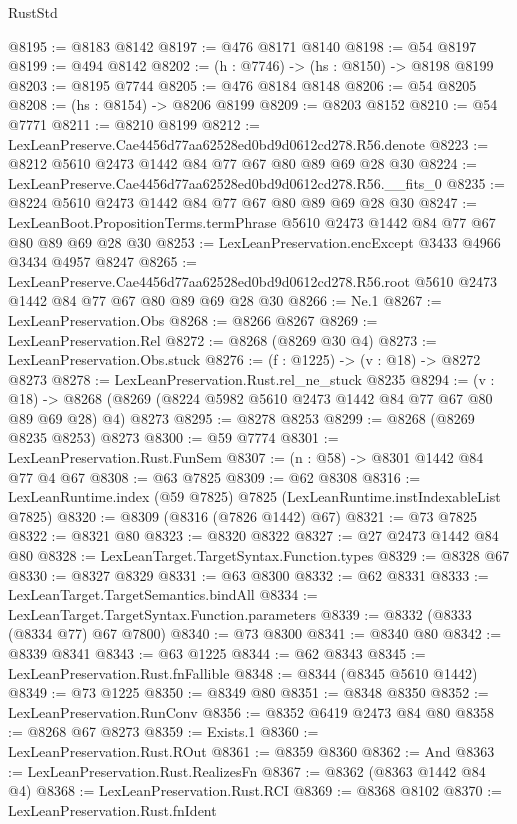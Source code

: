 \begin{lexlean}{RustStd}
\begin{coremodule}
@8195 := @8183 @8142
@8197 := @476 @8171 @8140
@8198 := @54 @8197
@8199 := @494 @8142
@8202 := (h : @7746) -> (hs : @8150) -> @8198 @8199
@8203 := @8195 @7744
@8205 := @476 @8184 @8148
@8206 := @54 @8205
@8208 := (hs : @8154) -> @8206 @8199
@8209 := @8203 @8152
@8210 := @54 @7771
@8211 := @8210 @8199
@8212 := LexLeanPreserve.Cae4456d77aa62528ed0bd9d0612cd278.R56.denote
@8223 := @8212 @5610 @2473 @1442 @84 @77 @67 @80 @89 @69 @28 @30
@8224 := LexLeanPreserve.Cae4456d77aa62528ed0bd9d0612cd278.R56.__fits_0
@8235 := @8224 @5610 @2473 @1442 @84 @77 @67 @80 @89 @69 @28 @30
@8247 := LexLeanBoot.PropositionTerms.termPhrase @5610 @2473 @1442 @84 @77 @67 @80 @89 @69 @28 @30
@8253 := LexLeanPreservation.encExcept @3433 @4966 @3434 @4957 @8247
@8265 := LexLeanPreserve.Cae4456d77aa62528ed0bd9d0612cd278.R56.root
    @5610
    @2473
    @1442
    @84
    @77
    @67
    @80
    @89
    @69
    @28
    @30
@8266 := Ne.{1}
@8267 := LexLeanPreservation.Obs
@8268 := @8266 @8267
@8269 := LexLeanPreservation.Rel
@8272 := @8268 (@8269 @30 @4)
@8273 := LexLeanPreservation.Obs.stuck
@8276 := (f : @1225) -> (v : @18) -> @8272 @8273
@8278 := LexLeanPreservation.Rust.rel_ne_stuck @8235
@8294 := (v : @18) ->
  @8268 (@8269 (@8224 @5982 @5610 @2473 @1442 @84 @77 @67 @80 @89 @69 @28) @4) @8273
@8295 := @8278 @8253
@8299 := @8268 (@8269 @8235 @8253) @8273
@8300 := @59 @7774
@8301 := LexLeanPreservation.Rust.FunSem
@8307 := (n : @58) -> @8301 @1442 @84 @77 @4 @67
@8308 := @63 @7825
@8309 := @62 @8308
@8316 := LexLeanRuntime.index (@59 @7825) @7825 (LexLeanRuntime.instIndexableList @7825)
@8320 := @8309 (@8316 (@7826 @1442) @67)
@8321 := @73 @7825
@8322 := @8321 @80
@8323 := @8320 @8322
@8327 := @27 @2473 @1442 @84 @80
@8328 := LexLeanTarget.TargetSyntax.Function.types
@8329 := @8328 @67
@8330 := @8327 @8329
@8331 := @63 @8300
@8332 := @62 @8331
@8333 := LexLeanTarget.TargetSemantics.bindAll
@8334 := LexLeanTarget.TargetSyntax.Function.parameters
@8339 := @8332 (@8333 (@8334 @77) @67 @7800)
@8340 := @73 @8300
@8341 := @8340 @80
@8342 := @8339 @8341
@8343 := @63 @1225
@8344 := @62 @8343
@8345 := LexLeanPreservation.Rust.fnFallible
@8348 := @8344 (@8345 @5610 @1442)
@8349 := @73 @1225
@8350 := @8349 @80
@8351 := @8348 @8350
@8352 := LexLeanPreservation.RunConv
@8356 := @8352 @6419 @2473 @84 @80
@8358 := @8268 @67 @8273
@8359 := Exists.{1}
@8360 := LexLeanPreservation.Rust.ROut
@8361 := @8359 @8360
@8362 := And
@8363 := LexLeanPreservation.Rust.RealizesFn
@8367 := @8362 (@8363 @1442 @84 @4)
@8368 := LexLeanPreservation.Rust.RCI
@8369 := @8368 @8102
@8370 := LexLeanPreservation.Rust.fnIdent

\end{coremodule}
\end{lexlean}
